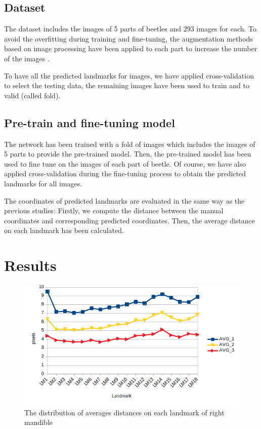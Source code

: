 \documentclass[12pt, a4paper]{article}
\begin{document}
\subsection{Dataset}
The dataset includes the images of 5 parts of beetles and $293$ images for each.  To avoid the overfitting during training and fine-tuning, the augmentation methods based on image processing have been applied to each part to increase the number of the images \cite{}.

To have all the predicted landmarks for images, we have applied cross-validation to select the testing data, the remaining images have been used to train and to valid (called fold).
\subsection{Pre-train and fine-tuning model}
The network has been trained with a fold of images which includes the images of 5 parts to provide the pre-trained model. Then, the pre-trained model has been used to fine tune on the images of each part of beetle. Of course, we have also applied cross-validation during the fine-tuning process to obtain the predicted landmarks for all images.

The coordinates of predicted landmarks are evaluated in the same way as the previous studies: Firstly, we compute the distance between the manual coordinates and corresponding predicted coordinates. Then, the average distance on each landmark has been calculated.
\section{Results}
\begin{figure}[h]
	\caption{The distribution of averages distances on each landmark of right mandible}
	\centering
	\includegraphics[scale=.71]{images/5parts/md.png}
\end{figure}
\end{document}
